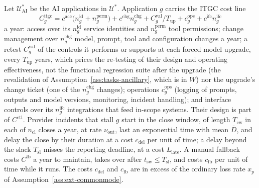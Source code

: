 \begin{assumption}\label{ass:acct-itgc}
Let $\mathcal U^*_{\mathrm{AI}}$ be the AI applications in $\mathcal U^*$. Application $g$ carries the ITGC cost line
\begin{equation}\label{eq:acct-itgc}
C^{\mathrm{itgc}}_g=c^{\mathrm{acc}}\bigl(n^{\mathrm{id}}_g+n^{\mathrm{perm}}_g\bigr)+c^{\mathrm{chg}}n^{\mathrm{chg}}_g+C^{\mathrm{val}}_g/T_{\mathrm{up}}+c^{\mathrm{ops}}_g+c^{\mathrm{ifc}}n^{\mathrm{ifc}}_g
\end{equation}
a year: access over its $n^{\mathrm{id}}_g$ service identities and $n^{\mathrm{perm}}_g$ tool permissions; change management over $n^{\mathrm{chg}}_g$ model, prompt, tool and configuration changes a year; a retest $C^{\mathrm{val}}_g$ of the controls it performs or supports at each forced model upgrade, every $T_{\mathrm{up}}$ years, which prices the re-testing of their design and operating effectiveness, not the functional regression suite after the upgrade (the revalidation of Assumption~\ref{ass:tasks-ancillary}, which is in $W$) nor the upgrade's change ticket (one of the $n^{\mathrm{chg}}_g$ changes); operations $c^{\mathrm{ops}}_g$ (logging of prompts, outputs and model versions, monitoring, incident handling); and interface controls over its $n^{\mathrm{ifc}}_g$ integrations that feed in-scope systems. Their design is part of $C^{\mathrm{ctl}}$. Provider incidents that stall $g$ start in the close window, of length $T_{\mathrm{cw}}$ in each of $n_{\mathrm{cl}}$ closes a year, at rate $\nu_{\mathrm{out}}$, last an exponential time with mean $\bar D$, and delay the close by their duration at a cost $c_{\mathrm{del}}$ per unit of time; a delay beyond the slack $T_{\mathrm{sl}}$ misses the reporting deadline, at a cost $L_{\mathrm{late}}$. A manual fallback costs $C^{\mathrm{fb}}$ a year to maintain, takes over after $t_{\mathrm{sw}}\le T_{\mathrm{sl}}$, and costs $c_{\mathrm{fb}}$ per unit of time while it runs. The costs $c_{\mathrm{del}}$ and $c_{\mathrm{fb}}$ are in excess of the ordinary loss rate $x_p$ of Assumption~\ref{ass:ext-commonmode}.
\end{assumption}

